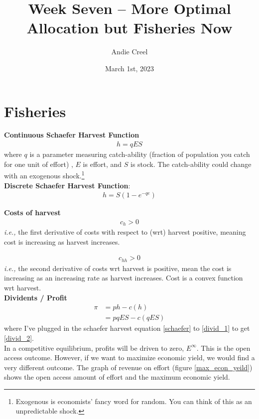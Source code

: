 \documentclass{article}
\title{Week Seven -- More Optimal Allocation but Fisheries Now}
\author{Andie Creel}
\date{March 1st, 2023}
\begin{document}
\maketitle

\section{Fisheries}
\textbf{Continuous Schaefer Harvest Function}
\begin{align}
    h = q E S
    \label{schaefer}
\end{align}
where $q$ is a parameter measuring catch-ability (fraction of population you catch for one unit of effort) , $E$ is effort, and $S$ is stock. The catch-ability could change with an exogenous shock.\footnote{Exogenous is economists' fancy word for random. You can think of this as an unpredictable shock.} \\

\textbf{Discrete Schaefer Harvest Function}:
\begin{align}
    h = S(1 - e^{-qe})
\end{align}

\textbf{Costs of harvest}
\begin{align}
    c_h > 0
\end{align}
\textit{i.e.,} the first derivative of costs with respect to (wrt) harvest positive, meaning cost is increasing as harvest increases.

\begin{align}
    c_{hh} >0
\end{align}
\textit{i.e.,} the second derivative of costs wrt harvest is positive, mean the cost is increasing as an increasing rate as harvest increases. Cost is a convex function wrt harvest. \\

\textbf{Dividents / Profit}
\begin{align}
    \pi &= ph - c(h) \label{divid_1} \\
    &= pqES - c(qES) \label{divid_2} 
\end{align}
where I've plugged in the schaefer harvest equation \ref{schaefer} to \ref{divid_1} to get \ref{divid_2}.\\

In a competitive equilibrium, profits will be driven to zero, $E^\infty$. This is the open access outcome. However, if we want to maximize economic yield, we would find a very different outcome. The graph of revenue on effort (figure \ref{max_econ_yeild}) shows the open access amount of effort and the maximum economic yield. \\
\end{document}
